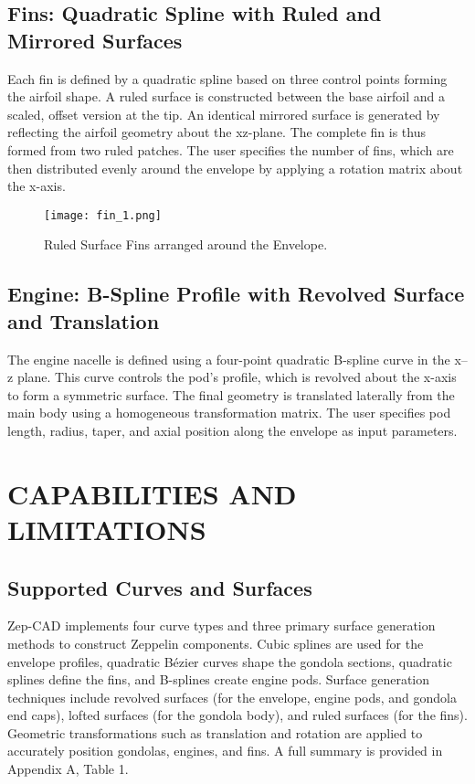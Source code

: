 \documentclass[10pt]{article}
\begin{document}
\subsection{Fins: Quadratic Spline with Ruled and Mirrored Surfaces}

Each fin is defined by a quadratic spline based on three control points forming the airfoil shape. A ruled 
surface is constructed between the base airfoil and a scaled, offset version at the tip. An identical mirrored 
surface is generated by reflecting the airfoil geometry about the xz-plane. The complete fin is thus formed from 
two ruled patches. The user specifies the number of fins, which are then distributed evenly around the envelope 
by applying a rotation matrix about the x-axis.

\begin{figure}[h!]
    \centering
    \texttt{[image: fin\_1.png]} %
    \caption{Ruled Surface Fins arranged around the Envelope.}
\end{figure}


\subsection{Engine: B-Spline Profile with Revolved Surface and Translation}

The engine nacelle is defined using a four-point quadratic B-spline curve in the x–z plane. This curve controls 
the pod’s profile, which is revolved about the x-axis to form a symmetric surface. The final geometry is 
translated laterally from the main body using a homogeneous transformation matrix. The user specifies pod 
length, radius, taper, and axial position along the envelope as input parameters.



\section{CAPABILITIES AND LIMITATIONS}

\subsection{Supported Curves and Surfaces}

Zep-CAD implements four curve types and three primary surface generation methods to construct Zeppelin components.
 Cubic splines are used for the envelope profiles, quadratic Bézier curves shape the gondola sections, quadratic 
 splines define the fins, and B-splines create engine pods. Surface generation techniques include revolved 
 surfaces (for the envelope, engine pods, and gondola end caps), lofted surfaces (for the gondola body), and 
 ruled surfaces (for the fins). Geometric transformations such as translation and rotation are applied to 
 accurately position gondolas, engines, and fins. A full summary is provided in Appendix A, Table 1.
\end{document}
